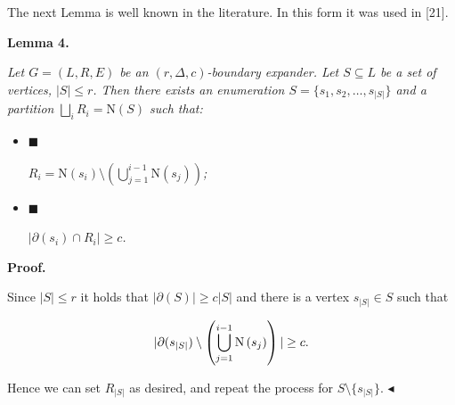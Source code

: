 The next Lemma is well known in the literature. In this form it was used in [21].\par





\par\medskip\noindent\textbf{
\textbf{Lemma 4}\textbf{.}
}\par



\emph{Let $G=(L,R,E)$ be an $(r,\Delta,c)$-boundary expander. Let $S\subseteq L$ be a set of
vertices, $|S|\leq r$. Then there exists an enumeration $S=\{s_{1},s_{2},\dots,s_{|S|}\}$ and a
partition $\bigsqcup\limits_{i}R_{i}=\mathrm{N}\left(S\right)$ such that:}\par


\begin{itemize}


\item[] 
$\blacksquare$ 


$R_{i}=\mathrm{N}\left(s_{i}\right)\setminus\left(\bigcup\limits_{j=1}^{i-1}%
\mathrm{N}\left(s_{j}\right)\right)$\emph{;}\par





\item[] 
$\blacksquare$ 


$|\partial(s_{i})\cap R_{i}|\geq c$\emph{.}\par





\end{itemize}






\par\medskip\noindent\textbf{Proof.}\par




Since $|S|\leq r$ it holds that $|\partial(S)|\geq c|S|$ and there is a vertex $s_{|S|}\in S$ such
that\par


\[\begin{gathered}
|\partial(s_{|S|})\setminus\left(\bigcup\limits_{j=1}^{i-1}\mathrm{N}\left(s_{%
j}\right)\right)|\geq c.
\end{gathered}\]


Hence we can set $R_{|S|}$ as desired, and repeat the process for $S\setminus\{s_{|S|}\}$.
$\blacktriangleleft$\par




